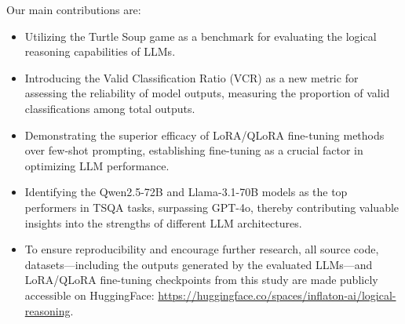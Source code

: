 \documentclass[conference]{IEEEtran}
\begin{document}
Our main contributions are:
\begin{itemize}
    \item Utilizing the Turtle Soup game as a benchmark for evaluating the logical reasoning capabilities of LLMs.
    
    \item Introducing the Valid Classification Ratio (VCR) as a new metric for assessing the reliability of model outputs, measuring the proportion of valid classifications among total outputs.

    \item Demonstrating the superior efficacy of LoRA/QLoRA fine-tuning methods over few-shot prompting, establishing fine-tuning as a crucial factor in optimizing LLM performance.

    \item Identifying the Qwen2.5-72B and Llama-3.1-70B models as the top performers in TSQA tasks, surpassing GPT-4o, thereby contributing valuable insights into the strengths of different LLM architectures.

    \item To ensure reproducibility and encourage further research, all source code, datasets—including the outputs generated by the evaluated LLMs—and LoRA/QLoRA fine-tuning checkpoints from this study are made publicly accessible on HuggingFace: \href{https://huggingface.co/spaces/inflaton-ai/logical-reasoning}{https://huggingface.co/spaces/inflaton-ai/logical-reasoning}.
\end{itemize}



 
\end{document}
